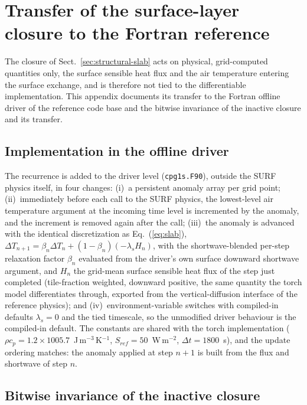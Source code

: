 \section{Transfer of the surface-layer closure to the Fortran reference}
\label{app:fortran-slab}

The closure of Sect.~\ref{sec:structural-slab} acts on physical,
grid-computed quantities only, the surface sensible heat flux and the
air temperature entering the surface exchange, and is therefore not
tied to the differentiable implementation. This appendix documents its
transfer to the Fortran offline driver of the reference code base and the
bitwise invariance of the inactive closure and its transfer.

\subsection{Implementation in the offline driver}

The recurrence is added to the driver level (\texttt{cpg1s.F90}), outside the
SURF physics itself, in four changes: (i)~a persistent anomaly array
per grid point; (ii)~immediately before each call to the SURF physics, the
lowest-level air temperature argument at the incoming time level is
incremented by the anomaly, and the increment is removed again after the
call; (iii)~the anomaly is advanced with the
identical discretization as Eq.~(\ref{eq:slab}),
$\Delta T_{n+1} = \beta_n \Delta T_n + (1-\beta_n)(-\lambda_s H_n)$, with the
shortwave-blended per-step relaxation factor $\beta_n$ evaluated from the
driver's own surface downward shortwave argument, and $H_n$
the grid-mean surface sensible heat flux of the step just completed
(tile-fraction weighted, downward positive, the same quantity the torch
model differentiates through, exported from the vertical-diffusion
interface of the reference physics); and (iv)~environment-variable switches
with compiled-in defaults $\lambda_s = 0$ and the tied timescale, so the
unmodified driver behaviour is the compiled-in default. The constants are
shared with the torch implementation
($\rho c_p = 1.2\times1005.7$~J\,m$^{-3}$\,K$^{-1}$,
$S_{ref} = 50$~W\,m$^{-2}$, $\Delta t = 1800$~s), and the update ordering
matches: the anomaly applied at step $n{+}1$ is built from the flux and
shortwave of step $n$.

\subsection{Bitwise invariance of the inactive closure}

